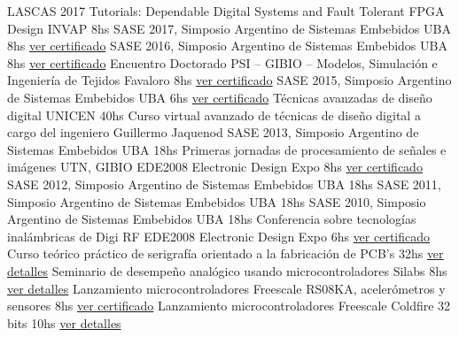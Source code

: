 \documentclass[11pt,a4paper,sans]{moderncv} 	%
\begin{document}
 		{LASCAS 2017 Tutorials: Dependable Digital Systems and Fault Tolerant FPGA Design} {INVAP} 					{8hs} 	{}	{}{} 
 		{SASE 2017, Simposio Argentino de Sistemas Embebidos}				{UBA} 						{8hs} 	{\href{http://disenioconingenio.com.ar/producto.php?products_id=444}{ver certificado}}	{}{} 
 		{SASE 2016, Simposio Argentino de Sistemas Embebidos}				{UBA} 						{8hs} 	{\href{http://disenioconingenio.com.ar/producto.php?products_id=443}{ver certificado}}	{}{} 
 		{Encuentro Doctorado PSI – GIBIO – Modelos, Simulación e Ingeniería de Tejidos}	{Favaloro} 					{8hs} 	{\href{http://disenioconingenio.com.ar/producto.php?products_id=419}{ver certificado}}	{}{} 
 		{SASE 2015, Simposio Argentino de Sistemas Embebidos}				{UBA} 						{6hs} 	{\href{http://disenioconingenio.com.ar/producto.php?products_id=411}{ver certificado}}	{}{} 
 		{Técnicas avanzadas de diseño digital}						{UNICEN} 					{40hs} 	{Curso virtual avanzado de técnicas de diseño digital a cargo del ingeniero Guillermo Jaquenod} {}{}
 		{SASE 2013, Simposio Argentino de Sistemas Embebidos}				{UBA} 						{18hs} 	{} 											{}{}
 		{Primeras jornadas de procesamiento de señales e imágenes}			{UTN, GIBIO EDE2008 Electronic Design Expo} 	{8hs}  	{\href{http://disenioconingenio.com.ar/producto.php?products_id=396}{ver certificado}} 	{}{}
 		{SASE 2012, Simposio Argentino de Sistemas Embebidos}				{UBA} 						{18hs} 	{} 											{}{}
 		{SASE 2011, Simposio Argentino de Sistemas Embebidos}				{UBA} 						{18hs} 	{} 											{}{}
 		{SASE 2010, Simposio Argentino de Sistemas Embebidos}				{UBA} 						{18hs} 	{} 											{}{}
 		{Conferencia sobre tecnologías inalámbricas de Digi RF}				{EDE2008 Electronic Design Expo} 		{6hs}  	{\href{http://disenioconingenio.com.ar/producto.php?products_id=394}{ver certificado}} 	{}{}
 		{Curso teórico práctico de serigrafía orientado a la fabricación de PCB's}	{32hs} 				 			{\href{http://disenioconingenio.com.ar/producto.php?products_id=389}{ver detalles}} 	{}{}
 		{Seminario de desempeño analógico usando microcontroladores Silabs}		{8hs} 				 			{\href{http://disenioconingenio.com.ar/producto.php?products_id=395}{ver detalles}} 	{}{}
 		{Lanzamiento microcontroladores Freescale RS08KA, acelerómetros y sensores} 	{8hs} 							{\href{http://disenioconingenio.com.ar/producto.php?products_id=384}{ver certificado}} 	{}{}
 		{Lanzamiento microcontroladores Freescale Coldfire 32 bits} 			{10hs}			 				{\href{http://disenioconingenio.com.ar/producto.php?products_id=385}{ver detalles}} 	{}{}
\end{document}

